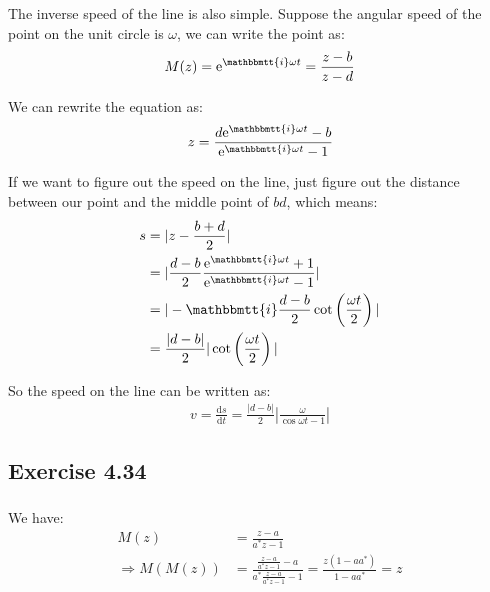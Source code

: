 \documentclass[]{ctexart}
\newcommand{\mi}{\mathbbmtt{i}}
\newcommand{\di}{\mathrm{d}}
\newcommand{\me}{\mathrm{e}}
\begin{document}
		The inverse speed of the line is also simple. Suppose the angular speed of the point on the unit circle is  $\omega$, we can write the point as:
			\begin{equation*}
			\begin{aligned}
				M(z)=\me^{\mi \omega t}=\frac{z-b}{z-d}
			\end{aligned}
			\end{equation*}
		
		We can rewrite the equation as:
			\begin{equation*}
			\begin{aligned}
				z=\frac{d\me^{\mi \omega t}-b}{\me^{\mi \omega t}-1}
			\end{aligned}
			\end{equation*}
		
		If we want to figure out the speed on the line, just figure out the distance between our point and the middle point of $bd$, which means:
			\begin{equation*}
			\begin{aligned}
				s&=|z-\frac{b+d}{2}|\\
				&=|\frac{d-b}{2}\frac{\me^{\mi \omega t}+1}{\me^{\mi \omega t}-1}|\\
				&=|-\mi \frac{d-b}{2}\cot\left(\frac{\omega t}{2}\right)|\\
				&=\frac{|d-b|}{2}|\cot\left(\frac{\omega t}{2}\right)|
			\end{aligned}
			\end{equation*}
		
		So the speed on the line can be written as:
			\begin{equation*}
			\begin{aligned}
				v=\frac{\di s}{\di t}=\frac{|d-b|}{2}|\frac{\omega}{\cos\omega t-1}|
			\end{aligned}
			\end{equation*}
			
	\subsection{Exercise 4.34}
		\subsubsection{}
			We have:
				\begin{equation*}
				\begin{aligned}
					M(z)&=\frac{z-a}{a^*z-1}\\
					\Rightarrow M(M(z))&=\frac{\frac{z-a}{a^*z-1}-a}{a^*\frac{z-a}{a^*z-1}-1}=\frac{z(1-aa^*)}{1-aa^*}=z
				\end{aligned}
				\end{equation*}
		
\end{document}
